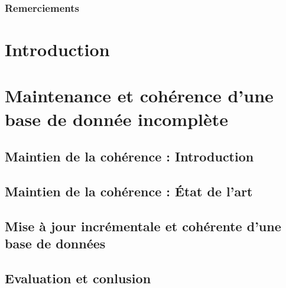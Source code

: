 
\pagestyle{fancy}


\frontmatter
\section*{Remerciements}
\lipsum[17-19]

\newpage

\dominitoc
\tableofcontents
{}
\listoffigures
{}
\listoftables

\mainmatter

\part{Introduction}



\part{Maintenance et cohérence d'une base de donnée incomplète}

\chapter{Maintien de la cohérence : Introduction}
\minitoc


\chapter{Maintien de la cohérence : État de l'art}
\minitoc


\chapter{Mise à jour incrémentale et cohérente d'une base de données}
\minitoc


\chapter{Evaluation et conlusion}
\minitoc


